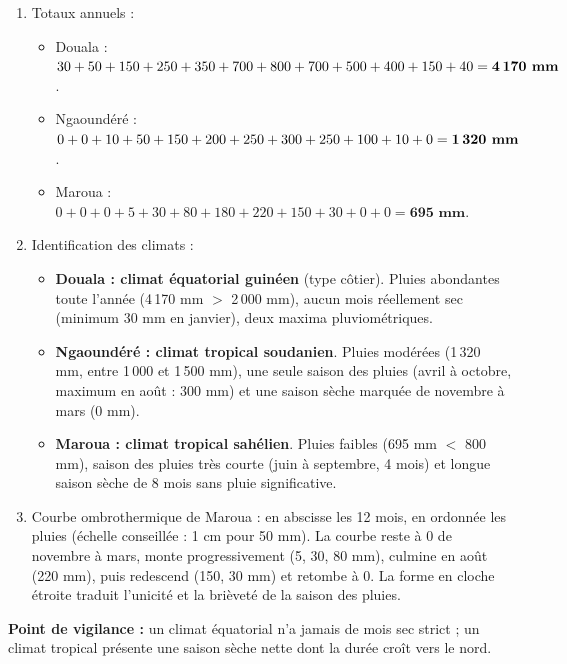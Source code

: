 \documentclass[11pt]{article}
\begin{document}
\begin{corrige}
\begin{enumerate}
\item Totaux annuels :
\begin{itemize}
\item Douala : $30+50+150+250+350+700+800+700+500+400+150+40 = \textbf{4\,170 mm}$.
\item Ngaoundéré : $0+0+10+50+150+200+250+300+250+100+10+0 = \textbf{1\,320 mm}$.
\item Maroua : $0+0+0+5+30+80+180+220+150+30+0+0 = \textbf{695 mm}$.
\end{itemize}
\item Identification des climats :
\begin{itemize}
\item \textbf{Douala : climat équatorial guinéen} (type côtier). Pluies abondantes toute l'année (4\,170 mm $>$ 2\,000 mm), aucun mois réellement sec (minimum 30 mm en janvier), deux maxima pluviométriques.
\item \textbf{Ngaoundéré : climat tropical soudanien}. Pluies modérées (1\,320 mm, entre 1\,000 et 1\,500 mm), une seule saison des pluies (avril à octobre, maximum en août : 300 mm) et une saison sèche marquée de novembre à mars (0 mm).
\item \textbf{Maroua : climat tropical sahélien}. Pluies faibles (695 mm $<$ 800 mm), saison des pluies très courte (juin à septembre, 4 mois) et longue saison sèche de 8 mois sans pluie significative.
\end{itemize}
\item Courbe ombrothermique de Maroua : en abscisse les 12 mois, en ordonnée les pluies (échelle conseillée : 1 cm pour 50 mm). La courbe reste à 0 de novembre à mars, monte progressivement (5, 30, 80 mm), culmine en août (220 mm), puis redescend (150, 30 mm) et retombe à 0. La forme en cloche étroite traduit l'unicité et la brièveté de la saison des pluies.
\end{enumerate}
\textbf{Point de vigilance :} un climat équatorial n'a jamais de mois sec strict ; un climat tropical présente une saison sèche nette dont la durée croît vers le nord.
\end{corrige}
\end{document}
